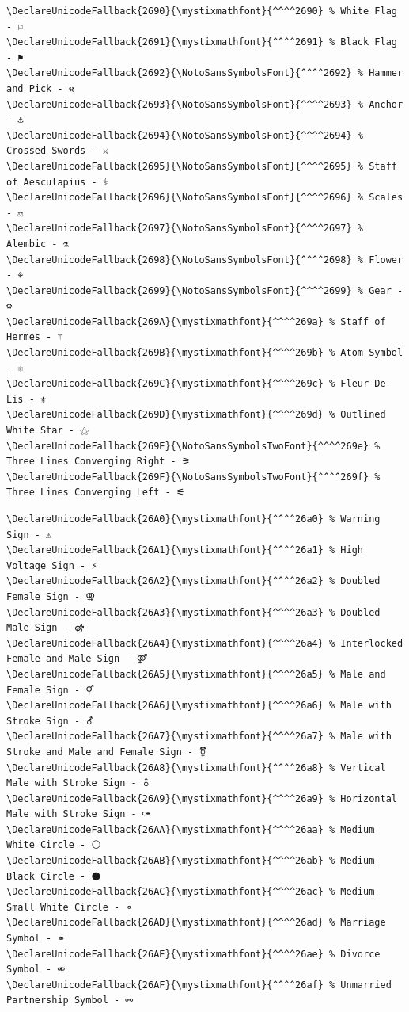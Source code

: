 \documentclass[12pt, twoside]{article}
\begin{document}
\newpage
\begin{verbatim}
\DeclareUnicodeFallback{2690}{\mystixmathfont}{^^^^2690} % White Flag - ⚐
\DeclareUnicodeFallback{2691}{\mystixmathfont}{^^^^2691} % Black Flag - ⚑
\DeclareUnicodeFallback{2692}{\NotoSansSymbolsFont}{^^^^2692} % Hammer and Pick - ⚒
\DeclareUnicodeFallback{2693}{\NotoSansSymbolsFont}{^^^^2693} % Anchor - ⚓
\DeclareUnicodeFallback{2694}{\NotoSansSymbolsFont}{^^^^2694} % Crossed Swords - ⚔
\DeclareUnicodeFallback{2695}{\NotoSansSymbolsFont}{^^^^2695} % Staff of Aesculapius - ⚕
\DeclareUnicodeFallback{2696}{\NotoSansSymbolsFont}{^^^^2696} % Scales - ⚖
\DeclareUnicodeFallback{2697}{\NotoSansSymbolsFont}{^^^^2697} % Alembic - ⚗
\DeclareUnicodeFallback{2698}{\NotoSansSymbolsFont}{^^^^2698} % Flower - ⚘
\DeclareUnicodeFallback{2699}{\NotoSansSymbolsFont}{^^^^2699} % Gear - ⚙
\DeclareUnicodeFallback{269A}{\mystixmathfont}{^^^^269a} % Staff of Hermes - ⚚
\DeclareUnicodeFallback{269B}{\mystixmathfont}{^^^^269b} % Atom Symbol - ⚛
\DeclareUnicodeFallback{269C}{\mystixmathfont}{^^^^269c} % Fleur-De-Lis - ⚜
\DeclareUnicodeFallback{269D}{\mystixmathfont}{^^^^269d} % Outlined White Star - ⚝
\DeclareUnicodeFallback{269E}{\NotoSansSymbolsTwoFont}{^^^^269e} % Three Lines Converging Right - ⚞
\DeclareUnicodeFallback{269F}{\NotoSansSymbolsTwoFont}{^^^^269f} % Three Lines Converging Left - ⚟

\end{verbatim}
\newpage
\begin{verbatim}
\DeclareUnicodeFallback{26A0}{\mystixmathfont}{^^^^26a0} % Warning Sign - ⚠
\DeclareUnicodeFallback{26A1}{\mystixmathfont}{^^^^26a1} % High Voltage Sign - ⚡
\DeclareUnicodeFallback{26A2}{\mystixmathfont}{^^^^26a2} % Doubled Female Sign - ⚢
\DeclareUnicodeFallback{26A3}{\mystixmathfont}{^^^^26a3} % Doubled Male Sign - ⚣
\DeclareUnicodeFallback{26A4}{\mystixmathfont}{^^^^26a4} % Interlocked Female and Male Sign - ⚤
\DeclareUnicodeFallback{26A5}{\mystixmathfont}{^^^^26a5} % Male and Female Sign - ⚥
\DeclareUnicodeFallback{26A6}{\mystixmathfont}{^^^^26a6} % Male with Stroke Sign - ⚦
\DeclareUnicodeFallback{26A7}{\mystixmathfont}{^^^^26a7} % Male with Stroke and Male and Female Sign - ⚧
\DeclareUnicodeFallback{26A8}{\mystixmathfont}{^^^^26a8} % Vertical Male with Stroke Sign - ⚨
\DeclareUnicodeFallback{26A9}{\mystixmathfont}{^^^^26a9} % Horizontal Male with Stroke Sign - ⚩
\DeclareUnicodeFallback{26AA}{\mystixmathfont}{^^^^26aa} % Medium White Circle - ⚪
\DeclareUnicodeFallback{26AB}{\mystixmathfont}{^^^^26ab} % Medium Black Circle - ⚫
\DeclareUnicodeFallback{26AC}{\mystixmathfont}{^^^^26ac} % Medium Small White Circle - ⚬
\DeclareUnicodeFallback{26AD}{\mystixmathfont}{^^^^26ad} % Marriage Symbol - ⚭
\DeclareUnicodeFallback{26AE}{\mystixmathfont}{^^^^26ae} % Divorce Symbol - ⚮
\DeclareUnicodeFallback{26AF}{\mystixmathfont}{^^^^26af} % Unmarried Partnership Symbol - ⚯

\end{verbatim}
\end{document}
